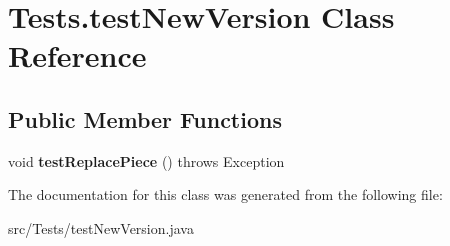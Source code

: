 \hypertarget{class_tests_1_1test_new_version}{}\section{Tests.\+test\+New\+Version Class Reference}
\label{class_tests_1_1test_new_version}
\subsection*{Public Member Functions}
\begin{DoxyCompactItemize}
\item 
\mbox{\label{class_tests_1_1test_new_version_ac076a3a8a3139fb9206c746ea2fa373e}} 
void {\bfseries test\+Replace\+Piece} ()  throws Exception
\end{DoxyCompactItemize}


The documentation for this class was generated from the following file\+:\begin{DoxyCompactItemize}
\item 
src/\+Tests/test\+New\+Version.\+java\end{DoxyCompactItemize}
